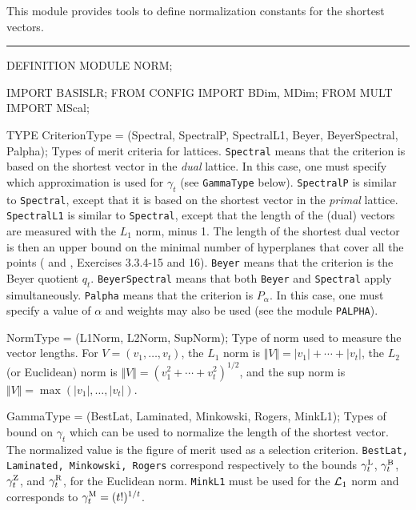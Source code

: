 
This module provides tools to define normalization constants
for the shortest vectors.

\bigskip\hrule
\code

DEFINITION MODULE NORM;

IMPORT BASISLR;
FROM CONFIG IMPORT BDim, MDim;
FROM MULT   IMPORT MScal;

TYPE
   CriterionType = (Spectral, SpectralP, SpectralL1, Beyer, BeyerSpectral,
                    Palpha);
\endcode
 \tabb  Types of merit criteria for lattices.
   {\tt Spectral} means that the criterion is based on the shortest
   vector in the {\em dual\/} lattice.
   In this case, one must specify which approximation is used for $\gamma_t$
   (see {\tt GammaType} below).
   {\tt SpectralP} is similar to {\tt Spectral}, except that
    it is based on the shortest vector in the {\em primal\/} lattice.
   {\tt SpectralL1} is similar to {\tt Spectral}, except that
    the length of the (dual) vectors are measured with the $L_1$ norm,
    minus 1.  The length of the shortest dual vector is then an upper
    bound on the minimal number of hyperplanes that cover all the points
    (\cite{rDIE75a} and \cite{rKNU97a}, Exercises 3.3.4-15 and 16).
   {\tt Beyer} means that the criterion is the Beyer quotient $q_t$.
   {\tt BeyerSpectral} means that both {\tt Beyer} and {\tt Spectral}
   apply simultaneously.
   {\tt Palpha} means that the criterion is $P_\alpha$.
   In this case, one must specify a value of $\alpha$
   and weights may also be used (see the module {\tt PALPHA}).   
 \endtabb
\code

   NormType = (L1Norm, L2Norm, SupNorm);
\endcode
 \tabb  Type of norm used to measure the vector lengths.
  For $V = (v_1,\dots,v_t)$, the $L_1$ norm is 
  $\Vert V\Vert = |v_1|+\cdots+|v_t|$, the $L_2$ (or Euclidean) norm is
  $\Vert V\Vert = (v_1^2+\cdots+v_t^2)^{1/2}$, and the sup norm is
  $\Vert V\Vert = \max(|v_1|,\dots,|v_t|)$.
 \endtabb
\code

   GammaType = (BestLat, Laminated, Minkowski, Rogers, MinkL1);
\endcode
 \tabb  Types of bound on $\gamma_t$ which can be used to normalize 
   the length of the shortest vector.
   The normalized value is the  
   figure of merit used as a selection  criterion.
   {\tt BestLat, Laminated, Minkowski, Rogers} correspond
   respectively to the bounds $\gamma_t^{{\rm L}}$, $\gamma_t^{{\rm B}}$, 
   $\gamma_t^{{\rm Z}}$, and $\gamma_t^{{\rm R}}$, for the Euclidean norm.
   {\tt MinkL1} must be used for the ${\cal L}_1$ norm and corresponds to 
   $\gamma_t^{{\rm M}} = (t!)^{1/t}$.
 \endtabb
\code


